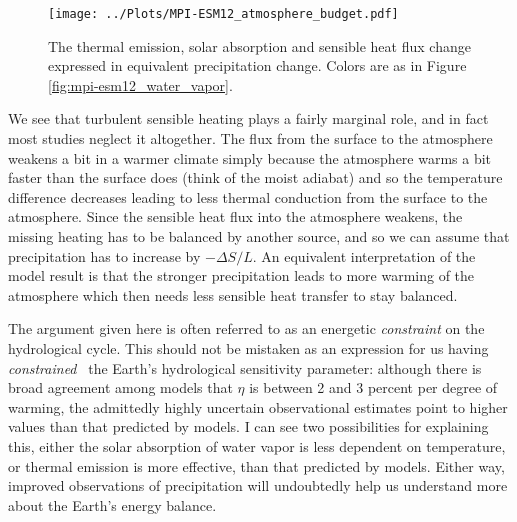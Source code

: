 \documentclass[12pt]{book}
\begin{document}
\begin{figure}
\begin{center}
\texttt{[image: ../Plots/MPI-ESM12\_atmosphere\_budget.pdf]}
\end{center}
\caption{ The thermal emission, solar absorption and sensible heat flux change expressed in equivalent precipitation change. Colors are as in Figure \ref{fig:mpi-esm12_water_vapor}. } 
\label{fig:mpi-esm12_atmosphere_budget}
\end{figure}

We see that turbulent sensible heating plays a fairly marginal role, and in fact most studies neglect it altogether. The flux from the surface to the atmosphere weakens a bit in a warmer climate simply because the atmosphere warms a bit faster than the surface does (think of the moist adiabat) and so the temperature difference decreases leading to less thermal conduction from the surface to the atmosphere. Since the sensible heat flux into the atmosphere weakens, the missing heating has to be balanced by another source, and so we can assume that precipitation has to increase by $-\Delta S/L$. An equivalent interpretation of the model result is that the stronger precipitation leads to more warming of the atmosphere which then needs less sensible heat transfer to stay balanced. 

The argument given here is often referred to as an energetic {\em constraint} on the hydrological cycle. This should not be mistaken as an expression for us having {\em constrained } the Earth's hydrological sensitivity parameter: although there is broad agreement among models that $\eta$ is between 2 and 3 percent per degree of warming, the admittedly highly uncertain observational estimates point to higher values than that predicted by models. I can see two possibilities for explaining this, either the solar absorption of water vapor is less dependent on temperature, or thermal emission is more effective, than that predicted by models. Either way, improved observations of precipitation will undoubtedly help us understand more about the Earth's energy balance.
\\
\end{document}
